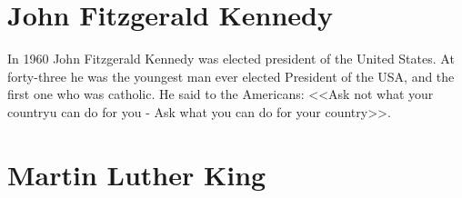 \section{John Fitzgerald Kennedy}
In 1960 John Fitzgerald Kennedy was elected president of the United States.
At forty-three he was the youngest man ever elected President of the USA, and the first one who was catholic.
He said to the Americans: <<Ask not what your countryu can do for you - Ask what you can do for your country>>.

\section{Martin Luther King}

